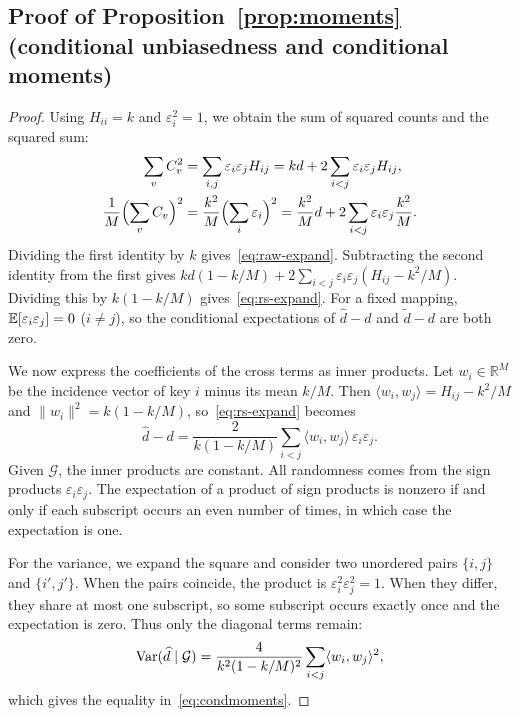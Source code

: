 \subsection{\texorpdfstring{Proof of Proposition~\ref{prop:moments} (conditional unbiasedness and conditional moments)}{Proof of conditional unbiasedness and conditional moments}}\label{app:proof-moments}
\begin{proof}
Using $H_{ii}=k$ and $\varepsilon_i^2=1$, we obtain the sum of squared counts and the squared sum:
\begin{align*}
\sum_vC_v^2&=\sum_{i,j}\varepsilon_i\varepsilon_jH_{ij}=kd+2\sum_{i<j}\varepsilon_i\varepsilon_jH_{ij},\\
\frac1M\Bigl(\sum_vC_v\Bigr)^2&=\frac{k^2}M\Bigl(\sum_i\varepsilon_i\Bigr)^2=\frac{k^2}Md+2\sum_{i<j}\varepsilon_i\varepsilon_j\frac{k^2}M.
\end{align*}
Dividing the first identity by $k$ gives~\eqref{eq:raw-expand}. Subtracting the second identity from the first gives $kd(1-k/M)+2\sum_{i<j}\varepsilon_i\varepsilon_j(H_{ij}-k^2/M)$. Dividing this by $k(1-k/M)$ gives~\eqref{eq:rs-expand}. For a fixed mapping, $\mathbb E[\varepsilon_i\varepsilon_j]=0$ ($i\ne j$), so the conditional expectations of $\widehat d-d$ and $\widetilde d-d$ are both zero.

We now express the coefficients of the cross terms as inner products. Let $w_i\in\mathbb R^M$ be the incidence vector of key $i$ minus its mean $k/M$. Then $\langle w_i,w_j\rangle=H_{ij}-k^2/M$ and $\|w_i\|^2=k(1-k/M)$, so~\eqref{eq:rs-expand} becomes
\begin{equation*}
\widehat d-d=\frac{2}{k(1-k/M)}\sum_{i<j}\langle w_i,w_j\rangle\,\varepsilon_i\varepsilon_j.
\end{equation*}
Given $\mathcal G$, the inner products are constant. All randomness comes from the sign products $\varepsilon_i\varepsilon_j$. The expectation of a product of sign products is nonzero if and only if each subscript occurs an even number of times, in which case the expectation is one.

For the variance, we expand the square and consider two unordered pairs $\{i,j\}$ and $\{i',j'\}$. When the pairs coincide, the product is $\varepsilon_i^2\varepsilon_j^2=1$. When they differ, they share at most one subscript, so some subscript occurs exactly once and the expectation is zero. Thus only the diagonal terms remain:
\begin{equation*}
\operatorname{Var}(\widehat d\mid\mathcal G)=\frac{4}{k^2(1-k/M)^2}\sum_{i<j}\langle w_i,w_j\rangle^2,
\end{equation*}
which gives the equality in~\eqref{eq:condmoments}.


\end{proof}
